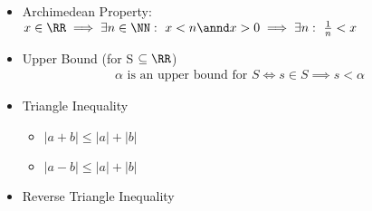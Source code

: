 \begin{itemize}
\item
  Archimedean Property:
  \(x \in \RR \implies \exists n\in \NN:~ x < n \annd x > 0 \implies \exists n:~ \frac{1}{n} < x\)
\item
  Upper Bound (for S \(\subseteq \RR\))
  \begin{align*}
    \alpha\text{ is an upper bound for } S \iff s \in S \implies s < \alpha
    \end{align*}
\item
  Triangle Inequality

  \begin{itemize}
  \tightlist
  \item
    \({ | a + b | \leq | a | + | b | }\)
  \item
    \({ | a - b | \leq | a | + | b | }\)
  \end{itemize}
\item
  Reverse Triangle Inequality


\end{itemize}
